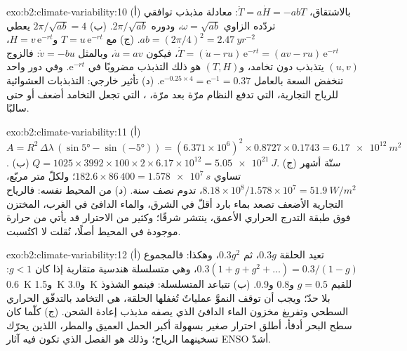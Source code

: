 \begin{solution}{exo:b2:climate-variability:10}
(أ) بالاشتقاق، $\ddot T = a\dot H = -abT$: معادلة مذبذب توافقي تردّده
الزاوي $\omega = \sqrt{ab}$، ودوره $2\pi/\sqrt{ab}$. (ب) $2\pi/\sqrt{ab} = 4$ يعطي $ab =
(2\pi/4)^2 = \qty{2.47}{yr^{-2}}$. (ج) مع $T = u\,\mathrm{e}^{-rt}$ و$H = v\,\mathrm{e}^{-rt}$،
$\dot T = (\dot u - ru)\,\mathrm{e}^{-rt} = (av - ru)\,\mathrm{e}^{-rt}$، فيكون $\dot u = av$،
وبالمثل $\dot v = -bu$: فالزوج $(u, v)$ يتذبذب دون تخامد، و$(T, H)$ هو ذلك التذبذب
مضروبًا في $\mathrm{e}^{-rt}$. وفي دور واحد تنخفض السعة بالعامل $\mathrm{e}^{-0.25 \times
4} = \mathrm{e}^{-1} = 0.37$. (د) تأثير خارجي: التذبذبات العشوائية للرياح التجارية، التي
تدفع النظام مرّة بعد مرّة، ، التي تجعل التخامد أضعف أو
حتى سالبًا.
\end{solution}

\begin{solution}{exo:b2:climate-variability:11}
(أ) $A = R^2 \,\Delta\lambda\,(\sin\ang{5} - \sin(\ang{-5})) = (6.371 \times 10^6)^2 \times 0.8727
\times 0.1743 = \qty{6.17e12}{m^2}$. (ب) $Q = 1025 \times 3992 \times 100 \times 2 \times 6.17
\times 10^{12} = \qty{5.05e21}{J}$. (ج) ستّة أشهر تساوي $182.6 \times 86\,400 = \qty{1.578e7}{s}$؛
ولكلّ متر مربّع، $8.18 \times 10^8/1.578 \times 10^7 = \qty{51.9}{W/m^2}$، تدوم نصف
سنة. (د) من المحيط نفسه: فالرياح التجارية الأضعف تصعد بماء بارد أقلّ في الشرق، والماء الدافئ
في الغرب، المختزن فوق طبقة التدرج الحراري الأعمق، ينتشر شرقًا؛ وكثير من الاحترار
قد يأتي من حرارة موجودة في المحيط أصلًا، نُقلت لا اكتُسبت.
\end{solution}

\begin{solution}{exo:b2:climate-variability:12}
(أ) تعيد الحلقة $0.3g$، ثم $0.3g^2$، وهكذا: فالمجموع $0.3(1 + g + g^2 + \dots) =
0.3/(1 - g)$، وهي متسلسلة هندسية متقاربة إذا كان $g < 1$: \qty{0.6}{K} و\qty{1.5}{K}
و\qty{3.0}{K} للقيم $g = 0.5$ و0.8 و0.9. (ب) تتباعد المتسلسلة: فينمو الشذوذ بلا
حدّ؛ ويجب أن توقف النموَّ عملياتٌ تُغفلها الحلقة، هي التخامد بالتدفّق الحراري
السطحي وتفريغ مخزون الماء الدافئ الذي يصفه مذبذب إعادة الشحن. (ج)
كلّما كان سطح البحر أدفأ، أطلق احترار صغير بسهولة أكبر الحمل العميق والمطر،
اللذين يحرّك تسخينهما الرياح؛ وذلك هو الفصل الذي تكون فيه آثار ENSO أشدّ.
\end{solution}

